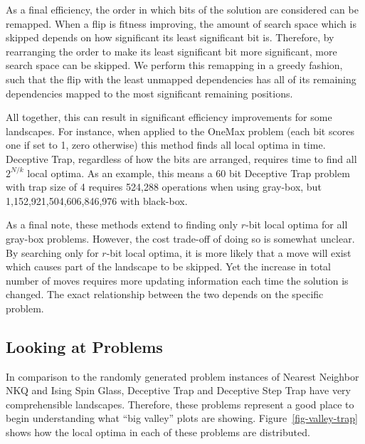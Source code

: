 As a final efficiency, the order in which bits of the solution are considered can be remapped. When a flip is fitness
improving, the amount of search space which is skipped depends on how significant its least significant bit is. Therefore,
by rearranging the order to make its least significant bit more significant, more search space can be skipped. We perform
this remapping in a greedy fashion, such that the flip with the least unmapped dependencies has all of its remaining dependencies
mapped to the most significant remaining positions.

All together, this can result in significant efficiency improvements for some landscapes. For instance, when applied to
the OneMax problem (each bit scores one if set to 1, zero otherwise) this method finds all local optima in  time.
Deceptive Trap, regardless of how the bits are arranged, requires  time to find all $2^{N/k}$ local optima.
As an example, this means a 60 bit
Deceptive Trap problem with trap size of 4 requires 524,288 operations when using gray-box, but 1,152,921,504,606,846,976
with black-box.

As a final note, these methods extend to finding only $r$-bit local optima for all gray-box problems. However,
the cost trade-off of doing so is somewhat unclear. By searching only for $r$-bit local optima, it is more likely
that a move will exist which causes part of the landscape to be skipped. Yet the increase in total number of moves
requires more updating information each time the solution is changed. The exact relationship between the two
depends on the specific problem.

\subsection{Looking at Problems}
In comparison to the randomly generated problem instances of Nearest Neighbor NKQ and Ising Spin Glass,
Deceptive Trap and Deceptive Step Trap have very comprehensible landscapes. Therefore, these problems represent
a good place to begin understanding what ``big valley'' plots are showing. Figure~\ref{fig-valley-trap} shows
how the local optima in each of these problems are distributed.

